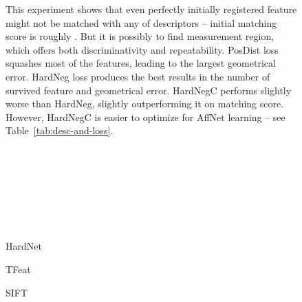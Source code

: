\documentclass[runningheads]{llncs}
\begin{document}
\begin{figure}[htb]
{This experiment shows that even perfectly initially registered feature might not be matched with any of descriptors -- initial matching score is roughly . But it is possibly to find measurement region, which offers both discriminativity and repeatability.
 PosDist loss squashes  most of the features, leading to the largest geometrical error. HardNeg loss produces the best results in the number of survived feature and geometrical error. HardNegC performs slightly worse than HardNeg, slightly outperforming it on matching score. However, HardNegC is easier to optimize for AffNet learning -- see Table~\ref{tab:desc-and-loss}.}
\label{fig:direct-opt-ideal}
\end{figure}\begin{figure}[htb] \begin{minipage}[h]{0.24\linewidth}
  \\
\end{minipage}
\hfill
\begin{minipage}[h]{0.24\linewidth}
  \\
\end{minipage}
\hfill
\begin{minipage}[h]{0.24\linewidth}
  \\
\end{minipage}
\hfill
\begin{minipage}[h]{0.24\linewidth}
  \\
\end{minipage}
\vfill \begin{minipage}[h]{0.24\linewidth}
 HardNet \\
\end{minipage}
\hfill
\begin{minipage}[h]{0.24\linewidth}
 TFeat \\
\end{minipage}
\hfill
\begin{minipage}[h]{0.24\linewidth}
 SIFT \\

\end{minipage}
\end{figure}
\end{document}
